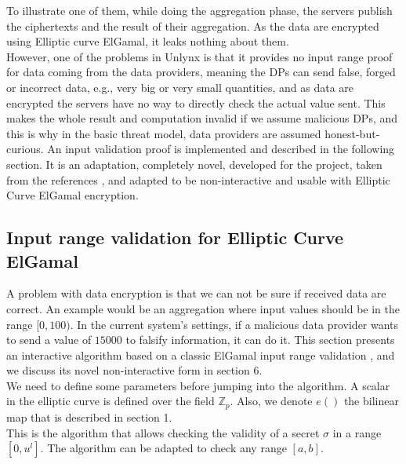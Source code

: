 \documentclass{article}
\begin{document}
To illustrate one of them, while doing the aggregation phase, the servers publish the ciphertexts and the result of their aggregation. As the data are encrypted using Elliptic curve ElGamal, it leaks nothing about them.\\
However, one of the problems in Unlynx is that it provides no input range proof for data coming from the data providers, meaning the DPs can send false, forged or incorrect data, e.g., very big or very small quantities, and as data are encrypted the servers have no way to directly check the actual value sent. This makes the whole result and computation invalid if we assume malicious DPs, and this is why in the basic threat model, data providers are assumed honest-but-curious. An input validation proof is implemented and described in the following section.  It is an adaptation, completely novel, developed for the project, taken from the references \cite{range}, and adapted to be non-interactive and usable with Elliptic Curve ElGamal encryption.\\

\subsection{Input range validation for Elliptic Curve ElGamal}

A problem with data encryption is that we can not be sure if received data are correct. An example would be an aggregation where input values should be in the range $[0,100)$. In the current system's settings, if a malicious data provider wants to send a value of $15000$ to falsify information, it can do it. This section presents an  interactive algorithm based on a classic ElGamal input range validation \cite{range}, and we discuss its novel non-interactive form in section 6.\\
We need to define some parameters before jumping into the algorithm. A scalar in the elliptic curve is defined over the field $\mathbb{Z}_p$. Also, we denote $e()$ the bilinear map that is described in section 1.\\
This is the algorithm that allows checking the validity of a secret $\sigma$ in a range $ [0,u^l]$. The algorithm can be adapted to check any range $[a,b]$.\\
\end{document}

